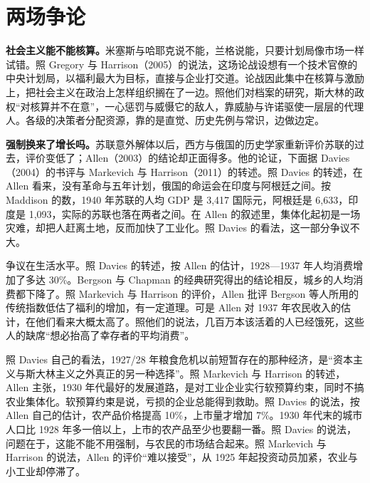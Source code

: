 \section{两场争论}\label{sec:soviet-debate}

\textbf{社会主义能不能核算。}米塞斯与哈耶克说不能，兰格说能，只要计划局像市场一样试错。照 Gregory 与 Harrison（2005）的说法，这场论战设想有一个技术官僚的中央计划局，以福利最大为目标，直接与企业打交道\cite{gregory2005}。论战因此集中在核算与激励上，把社会主义在政治上怎样组织搁在了一边\cite{gregory2005}。照他们对档案的研究，斯大林的政权“对核算并不在意”，一心惩罚与威慑它的敌人，靠威胁与许诺驱使一层层的代理人\cite{gregory2005}。各级的决策者分配资源，靠的是直觉、历史先例与常识，边做边定\cite{gregory2005}。

\textbf{强制换来了增长吗。}苏联意外解体以后，西方与俄国的历史学家重新评价苏联的过去，评价变低了；Allen（2003）的结论却正面得多\cite{davies2004}。他的论证，下面据 Davies（2004）的书评与 Markevich 与 Harrison（2011）的转述\cite{davies2004,markevich2011}。照 Davies 的转述，在 Allen 看来，没有革命与五年计划，俄国的命运会在印度与阿根廷之间\cite{davies2004}。按 Maddison 的数，1940 年苏联的人均 GDP 是 3,417 国际元，阿根廷是 6,633，印度是 1,093，实际的苏联也落在两者之间\cite{mpd2023}。在 Allen 的叙述里，集体化起初是一场灾难，却把人赶离土地，反而加快了工业化\cite{davies2004}。照 Davies 的看法，这一部分争议不大\cite{davies2004}。

争议在生活水平。照 Davies 的转述，按 Allen 的估计，1928—1937 年人均消费增加了多达 30\%\cite{davies2004}。Bergson 与 Chapman 的经典研究得出的结论相反，城乡的人均消费都下降了\cite{davies2004}。照 Markevich 与 Harrison 的评价，Allen 批评 Bergson 等人所用的传统指数低估了福利的增加，有一定道理\cite{markevich2011}。可是 Allen 对 1937 年农民收入的估计，在他们看来大概太高了\cite{markevich2011}。照他们的说法，几百万本该活着的人已经饿死，这些人的缺席“想必抬高了幸存者的平均消费”\cite{markevich2011}。

照 Davies 自己的看法，1927/28 年粮食危机以前短暂存在的那种经济，是“资本主义与斯大林主义之外真正的另一种选择”\cite{davies2004}。照 Markevich 与 Harrison 的转述，Allen 主张，1930 年代最好的发展道路，是对工业企业实行软预算约束，同时不搞农业集体化\cite{markevich2011}。软预算约束是说，亏损的企业总能得到救助。照 Davies 的说法，按 Allen 自己的估计，农产品价格提高 10\%，上市量才增加 7\%\cite{davies2004}。1930 年代末的城市人口比 1928 年多一倍以上，上市的农产品至少也要翻一番\cite{davies2004}。照 Davies 的说法，问题在于，这能不能不用强制，与农民的市场结合起来\cite{davies2004}。照 Markevich 与 Harrison 的说法，Allen 的评价“难以接受”，从 1925 年起投资动员加紧，农业与小工业却停滞了\cite{markevich2011}。

